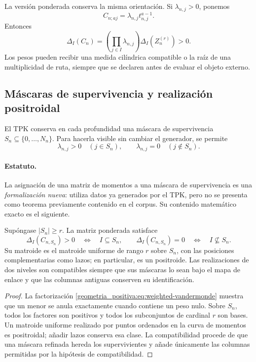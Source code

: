 La versión ponderada conserva la misma orientación. Si
\(\lambda_{n,j}>0\), ponemos
\[
 C_{n;aj}=\lambda_{n,j}t_{n,j}^{a-1}.
\]
Entonces
\begin{equation}
 \Delta_I(C_n)=\left(\prod_{j\in I}\lambda_{n,j}\right)
 \Delta_I(Z_n^{(r)})>0.
 \label{geometria_positiva:eq:weighted-vandermonde}
\end{equation}
Los pesos pueden recibir una medida cilíndrica compatible o la raíz de una
multiplicidad de ruta, siempre que se declaren antes de evaluar el objeto
externo.

\subsection{Máscaras de supervivencia y realización positroidal}

El TPK conserva en cada profundidad una máscara de supervivencia
\(S_n\subseteq\{0,\ldots,N_n\}\). Para hacerla visible sin cambiar el
generador, se permite
\[
 \lambda_{n,j}>0\quad(j\in S_n),\qquad
 \lambda_{n,j}=0\quad(j\notin S_n).
\]

\paragraph{Estatuto.}
La asignación de una matriz de momentos a una máscara de supervivencia es una
\emph{formalización nueva}: utiliza datos ya generados por el TPK, pero no se
presenta como teorema previamente contenido en el corpus. Su contenido
matemático exacto es el siguiente.

\begin{proposition}
\label{geometria_positiva:thm:tpk-positroid-cell}
Supóngase \(|S_n|\ge r\). La matriz ponderada satisface
\[
 \Delta_I(C_{n,S_n})>0\quad\Longleftrightarrow\quad I\subseteq S_n,
 \qquad
 \Delta_I(C_{n,S_n})=0\quad\Longleftrightarrow\quad I\not\subseteq S_n.
\]
Su matroide es el matroide uniforme de rango \(r\) sobre \(S_n\), con las
posiciones complementarias como lazos; en particular, es un positroide. Las
realizaciones de dos niveles son compatibles siempre que sus máscaras lo sean
bajo el mapa de enlace y que las columnas antiguas conserven su identificación.
\end{proposition}
\begin{proof}
La factorización \eqref{geometria_positiva:eq:weighted-vandermonde} muestra que un menor se anula
exactamente cuando contiene un peso nulo. Sobre \(S_n\), todos los factores son
positivos y todos los subconjuntos de cardinal \(r\) son bases. Un matroide
uniforme realizado por puntos ordenados en la curva de momentos es positroidal;
añadir lazos conserva esa clase. La compatibilidad procede de que una máscara
refinada hereda los supervivientes y añade únicamente las columnas permitidas
por la hipótesis de compatibilidad.
\end{proof}

